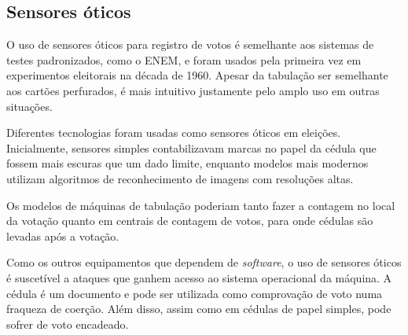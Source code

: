 \subsection{Sensores óticos}

O uso de sensores óticos para registro de votos é semelhante aos sistemas de
testes padronizados, como o ENEM, e foram usados pela primeira vez em
experimentos eleitorais na década de 1960. Apesar da tabulação ser semelhante
aos cartões perfurados, é mais intuitivo justamente pelo amplo uso em outras
situações.

Diferentes tecnologias foram usadas como sensores óticos em eleições.
Inicialmente, sensores simples contabilizavam marcas no papel da cédula que
fossem mais escuras que um dado limite, enquanto modelos mais modernos utilizam
algoritmos de reconhecimento de imagens com resoluções altas.

Os modelos de máquinas de tabulação poderiam tanto fazer a contagem no local da
votação quanto em centrais de contagem de votos, para onde cédulas são levadas
após a votação.

Como os outros equipamentos que dependem de \textit{software}, o uso de
sensores óticos é suscetível a ataques que ganhem acesso ao sistema operacional
da máquina. A cédula é um documento e pode ser utilizada como comprovação de
voto numa fraqueza de coerção. Além disso, assim como em cédulas de papel
simples, pode sofrer de voto encadeado.
